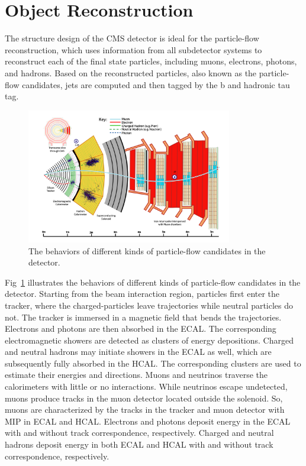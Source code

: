 
\section{Object Reconstruction}
\label{sec:cmsexperiment:reconstruction}

The structure design of the CMS detector is ideal for the particle-flow reconstruction, which uses information from all subdetector systems to reconstruct each of the final state particles, including muons, electrons, photons, and hadrons. Based on the reconstructed particles, also known as the particle-flow candidates, jets are computed and then tagged by the b and hadronic tau tag.

\begin{figure}[ht]
    \centering
    \includegraphics[width=0.8\textwidth]{chapters/CMSExperiment/sectionReconstruction/figures/pfa.png}
    \caption{The behaviors of different kinds of particle-flow candidates in the detector.}
    \label{fig:cmsexperiment:reconstruction:pfa}
\end{figure}

Fig~\ref{fig:cmsexperiment:reconstruction:pfa} illustrates the behaviors of different kinds of particle-flow candidates in the detector. Starting from the beam interaction region, particles first enter the tracker, where the charged-particles leave trajectories while neutral particles do not. The tracker is immersed in a magnetic field that bends the trajectories. Electrons and photons are then absorbed in the ECAL. The corresponding electromagnetic showers are detected as clusters of energy depositions. Charged and neutral hadrons may initiate showers in the ECAL as well, which are subsequently fully absorbed in the HCAL. The corresponding clusters are used to estimate their energies and directions. Muons and neutrinos traverse the calorimeters with little or no interactions. While neutrinos escape undetected, muons produce tracks in the muon detector located outside the solenoid. So, muons are characterized by the tracks in the tracker and muon detector with MIP in ECAL and HCAL. Electrons and photons deposit energy in the ECAL with and without track correspondence, respectively. Charged and neutral hadrons deposit energy in both ECAL and HCAL with and without track correspondence, respectively. 


